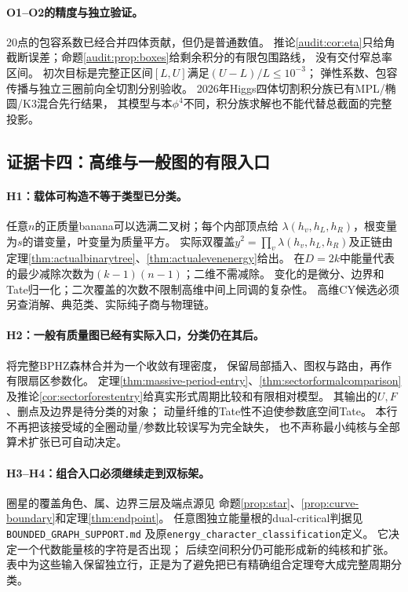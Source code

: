 \documentclass[11pt,a4paper]{ctexart}
\theoremstyle{cnplain}\newtheorem{theorem}{定理}[section]
\theoremstyle{definition}\newtheorem{definition}[theorem]{定义}
\theoremstyle{remark}\newtheorem{remark}[theorem]{注}
\begin{document}
\paragraph{O1--O2的精度与独立验证。}
20点的包容系数已经合并四体贡献，但仍是普通数值。
推论\ref{audit:cor:eta}只给角截断误差；命题\ref{audit:prop:boxes}给剩余积分的有限包围路线，
没有交付窄总率区间。
初次目标是完整正区间$[L,U]$满足$(U-L)/L\le10^{-3}$；
弹性系数、包容传播与独立三圈前向全切割分别验收。
2026年Higgs四体切割积分族已有MPL/椭圆/K3混合先行结果\cite{LitWWW}，
其模型与本$\phi^4$不同，积分族求解也不能代替总截面的完整投影。

\subsection{证据卡四：高维与一般图的有限入口}
\label{subsec:classopen}
\paragraph{H1：载体可构造不等于类型已分类。}
任意$n$的正质量banana可以选满二叉树；每个内部顶点给
$\lambda(h_v,h_L,h_R)$，根变量为$s$的谱变量，叶变量为质量平方。
实际双覆盖$y^2=\prod_v\lambda(h_v,h_L,h_R)$及正链由
定理\ref{thm:actualbinarytree}、\ref{thm:actualevenenergy}给出。
在$D=2k$中能量代表的最少减除次数为$(k-1)(n-1)$；二维不需减除。
变化的是微分、边界和Tate归一化；二次覆盖的次数不限制高维中间上同调的复杂性。
高维CY候选必须另查消解、典范类、实际纯子商与物理链。

\paragraph{H2：一般有质量图已经有实际入口，分类仍在其后。}
将完整BPHZ森林合并为一个收敛有理密度，
保留局部插入、图权与路由，再作有限扇区参数化。
定理\ref{thm:massive-period-entry}、\ref{thm:sectorformalcomparison}
及推论\ref{cor:sectorforestentry}给真实形式周期比较和有限相对模型。
其输出的$U,F$、删点及边界是待分类的对象；
动量纤维的Tate性不迫使参数底空间Tate。
本行不再把该接受域的全圈动量/参数比较误写为完全缺失，
也不声称最小纯核与全部算术扩张已可自动决定。

\paragraph{H3--H4：组合入口必须继续走到双标架。}
圈星的覆盖角色、属、边界三层及端点源见
命题\ref{prop:star}、\ref{prop:curve-boundary}和定理\ref{thm:endpoint}。
任意图独立能量根的dual-critical判据见\texttt{BOUNDED\_GRAPH\_SUPPORT.md}
及原\texttt{energy\_character\_classification}定义。
它决定一个代数能量核的字符是否出现；
后续空间积分仍可能形成新的纯核和扩张。
表中为这些输入保留独立行，正是为了避免把已有精确组合定理夸大成完整周期分类。
\end{document}
